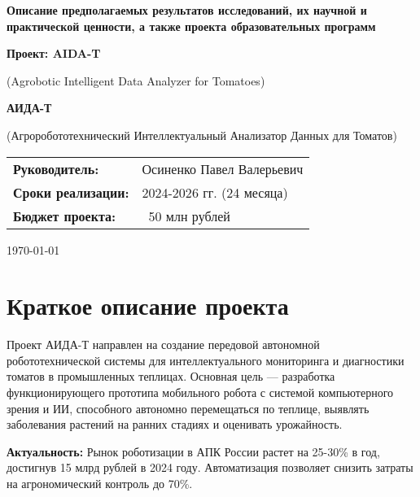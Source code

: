 \documentclass[12pt,a4paper]{article}
\begin{document}
\begin{titlepage}
    \centering
    \vspace*{1cm}
    
    {\Huge\bfseries Описание предполагаемых результатов исследований, их научной и практической ценности, а также проекта образовательных программ\par}
    
    \vspace{1.5cm}
    
    {\Large\bfseries Проект: AIDA-T\par}
    {\large (Agrobotic Intelligent Data Analyzer for Tomatoes)\par}
    
    \vspace{1cm}
    
    {\large\bfseries АИДА-Т\par}
    {\large (Агроробототехнический Интеллектуальный Анализатор Данных для Томатов)\par}
    
    \vspace{1.5cm}
    
    \begin{tabular}{ll}
        \textbf{Руководитель:} & Осиненко Павел Валерьевич \\
        \textbf{Сроки реализации:} & 2024-2026 гг. (24 месяца) \\
        \textbf{Бюджет проекта:} & ~50 млн рублей
    \end{tabular}
    
    \vfill
    
    {\large \today\par}
\end{titlepage}

\section{Краткое описание проекта}

Проект АИДА-Т направлен на создание передовой автономной робототехнической системы для интеллектуального мониторинга и диагностики томатов в промышленных теплицах. Основная цель — разработка функционирующего прототипа мобильного робота с системой компьютерного зрения и ИИ, способного автономно перемещаться по теплице, выявлять заболевания растений на ранних стадиях и оценивать урожайность.

\textbf{Актуальность:} Рынок роботизации в АПК России растет на 25-30\% в год, достигнув 15 млрд рублей в 2024 году. Автоматизация позволяет снизить затраты на агрономический контроль до 70\%.
\end{document}
